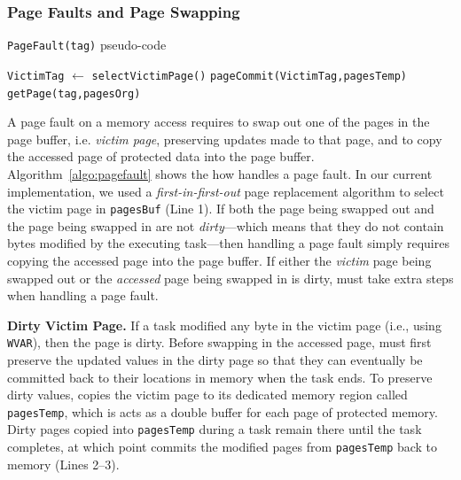 \subsubsection{Page Faults and Page Swapping}

\begin{algorithm}[t]
	\caption{\texttt{PageFault(tag)} pseudo-code}
	\label{algo:pagefault}
	\scriptsize
	\begin{algorithmic}[1]
		\State \texttt{VictimTag} $\leftarrow$ \texttt{selectVictimPage()} 
			
		\State \texttt{pageCommit(VictimTag,pagesTemp)} 
		\EndIf
		 
		 
		\Else
		\State \texttt{getPage(tag,pagesOrg)} 
		\EndIf 
	\end{algorithmic}
\end{algorithm}

A page fault on a memory access requires \sys to swap out one of the pages in the page buffer, i.e. \emph{victim page}, preserving updates made to that page, and to copy the accessed page of protected data into the page buffer. Algorithm~\ref{algo:pagefault} shows the how \sys handles a page fault. In our current implementation, we used a \emph{first-in-first-out} page replacement algorithm to select the victim page in \texttt{pagesBuf} (Line 1). If both the page being swapped out and the page being swapped in are not {\em dirty}---which means that they do not contain bytes modified by the executing task---then handling a page fault simply requires copying the accessed page into the page buffer. If either the {\em victim} page being swapped out or the {\em accessed} page being swapped in is dirty, \sys must take extra steps when handling a page fault. 

\textbf{Dirty Victim Page.} If a task modified any byte in the victim page (i.e.,  using \texttt{WVAR}), then the page is dirty. Before swapping in the accessed page, \sys must first preserve the updated values in the dirty page so that they can eventually be committed back to their locations in memory when the task ends. To preserve dirty values, \sys copies the victim page to its dedicated memory region called \texttt{pagesTemp}, which is acts as a double buffer for each page of protected memory. Dirty pages copied into {\tt pagesTemp} during a task remain there until the task completes, at which point \sys commits the modified pages from {\tt pagesTemp} back to memory (Lines 2--3).  

